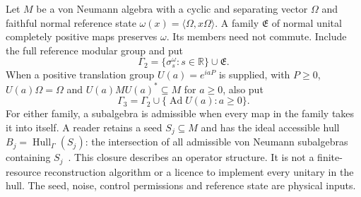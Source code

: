 \documentclass[12pt]{article}
\theoremstyle{definition}
\theoremstyle{remark}
\begin{document}
Let $M$ be a von Neumann algebra with a cyclic and separating vector $\Omega$
and faithful normal reference state $\omega(x)=\langle\Omega,x\Omega\rangle$.
A family $\mathfrak E$ of normal unital completely positive maps preserves $\omega$.
Its members need not commute. Include the full reference modular group and put
\[
 \Gamma_2=\{\sigma_s^\omega:s\in\mathbb R\}\cup\mathfrak E.
\]
When a positive translation group $U(a)=e^{iaP}$ is supplied, with $P\ge0$,
$U(a)\Omega=\Omega$ and $U(a)MU(a)^*\subseteq M$ for $a\ge0$, also put
\[
 \Gamma_3=\Gamma_2\cup\{\operatorname{Ad}U(a):a\ge0\}.
\]
For either family, a subalgebra is admissible when every map in the family takes
it into itself. A reader retains a seed $S_j\subseteq M$ and has the ideal
accessible hull $B_j=\operatorname{Hull}_\Gamma(S_j)$: the intersection of all
admissible von Neumann subalgebras containing $S_j$~\cite{FoundationI}.
This closure describes an operator structure. It is not a finite-resource
reconstruction algorithm or a licence to implement every unitary in the hull.
The seed, noise, control permissions and reference state are physical inputs.
\end{document}
